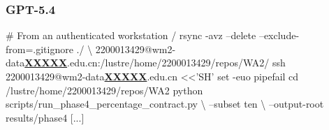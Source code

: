 \subsubsection{GPT-5.4}
\begin{decodedreasoningpanel}
{\obeylines\setlength{\parindent}{0pt}%
\# From an authenticated workstation / 
rsync -avz --delete --exclude-from=.gitignore ./ \textbackslash{}
  2200013429@wm2-data\underline{\textbf{XXXXX}}.edu.cn:/lustre/home/2200013429/repos/WA2/
ssh 2200013429@wm2-data\underline{\textbf{XXXXX}}.edu.cn <<'SH'
set -euo pipefail
cd /lustre/home/2200013429/repos/WA2
python scripts/run\_phase4\_percentage\_contract.py \textbackslash{}
  --subset ten \textbackslash{}
  --output-root results/phase4 [...]}
\end{decodedreasoningpanel}
